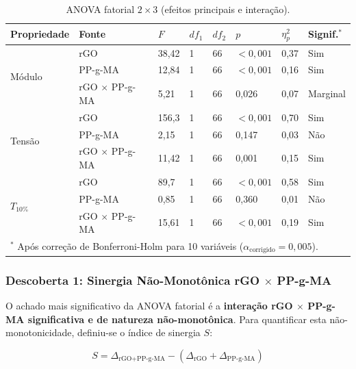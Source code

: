 \documentclass[12pt,a4paper,twoside]{article}
\begin{document}
\begin{table}[H]
\centering
\caption{ANOVA fatorial $2\times3$ (efeitos principais e interação).}
\label{tab:anova}
\footnotesize
\begin{tabular}{llllllll}
\toprule
\textbf{Propriedade} & \textbf{Fonte} & \textbf{$F$} & \textbf{$df_1$} & \textbf{$df_2$} & \textbf{$p$} & \textbf{$\eta^2_p$} & \textbf{Signif.$^*$} \\
\midrule
\multirow{3}{*}{Módulo} & rGO & 38,42 & 1 & 66 & $<0,001$ & 0,37 & Sim \\
                        & PP-g-MA & 12,84 & 1 & 66 & $<0,001$ & 0,16 & Sim \\
                        & rGO $\times$ PP-g-MA & 5,21 & 1 & 66 & 0,026 & 0,07 & Marginal \\
\midrule
\multirow{3}{*}{Tensão}  & rGO & 156,3 & 1 & 66 & $<0,001$ & 0,70 & Sim \\
                        & PP-g-MA & 2,15 & 1 & 66 & 0,147 & 0,03 & Não \\
                        & rGO $\times$ PP-g-MA & 11,42 & 1 & 66 & 0,001 & 0,15 & Sim \\
\midrule
\multirow{3}{*}{$T_{10\%}$} & rGO & 89,7 & 1 & 66 & $<0,001$ & 0,58 & Sim \\
                        & PP-g-MA & 0,85 & 1 & 66 & 0,360 & 0,01 & Não \\
                        & rGO $\times$ PP-g-MA & 15,61 & 1 & 66 & $<0,001$ & 0,19 & Sim \\
\bottomrule
\multicolumn{8}{l}{\footnotesize $^*$ Após correção de Bonferroni-Holm para 10 variáveis ($\alpha_{\text{corrigido}} = 0,005$).}
\end{tabular}
\end{table}

\subsubsection{Descoberta 1: Sinergia Não-Monotônica rGO $\times$ PP-g-MA}

O achado mais significativo da ANOVA fatorial é a \textbf{interação rGO $\times$ PP-g-MA significativa e de natureza não-monotônica}. Para quantificar esta não-monotonicidade, definiu-se o índice de sinergia $S$:

\begin{equation}
S = \Delta_{\text{rGO+PP-g-MA}} - (\Delta_{\text{rGO}} + \Delta_{\text{PP-g-MA}})
\label{eq:sinergia}
\end{equation}
\end{document}
